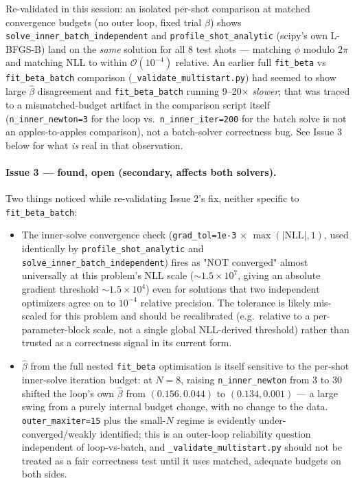 \documentclass[11pt,a4paper]{article}
\newcommand{\code}[1]{\texttt{#1}}
\begin{document}
Re-validated in this session: an isolated per-shot comparison at matched
convergence budgets (no outer loop, fixed trial $\beta$) shows
\code{solve\_inner\_batch\_independent} and \code{profile\_shot\_analytic}
(scipy's own L-BFGS-B) land on the \emph{same} solution for all 8 test
shots --- matching $\phi$ modulo $2\pi$ and matching NLL to within
$\mathcal{O}(10^{-4})$ relative. An earlier full \code{fit\_beta} vs
\code{fit\_beta\_batch} comparison (\code{\_validate\_multistart.py}) had
seemed to show large $\hat\beta$ disagreement and \code{fit\_beta\_batch}
running 9--20$\times$ \emph{slower}; that was traced to a mismatched-budget
artifact in the comparison script itself (\code{n\_inner\_newton=3} for the
loop vs.\ \code{n\_inner\_iter=200} for the batch solve is not an
apples-to-apples comparison), not a batch-solver correctness bug. See
Issue 3 below for what \emph{is} real in that observation.

\paragraph{Issue 3 --- found, open (secondary, affects both solvers).} Two
things noticed while re-validating Issue 2's fix, neither specific to
\code{fit\_beta\_batch}:
\begin{itemize}
\item The inner-solve convergence check (\code{grad\_tol=1e-3} $\times$
  $\max(|\mathrm{NLL}|,1)$, used identically by \code{profile\_shot\_analytic}
  and \code{solve\_inner\_batch\_independent}) fires as "NOT converged"
  almost universally at this problem's NLL scale ($\sim\!1.5\times10^7$,
  giving an absolute gradient threshold $\sim\!1.5\times10^4$) even for
  solutions that two independent optimizers agree on to $10^{-4}$ relative
  precision. The tolerance is likely mis-scaled for this problem and
  should be recalibrated (e.g.\ relative to a per-parameter-block scale,
  not a single global NLL-derived threshold) rather than trusted as a
  correctness signal in its current form.
\item $\hat\beta$ from the full nested \code{fit\_beta} optimisation is
  itself sensitive to the per-shot inner-solve iteration budget: at $N=8$,
  raising \code{n\_inner\_newton} from 3 to 30 shifted the loop's own
  $\hat\beta$ from $(0.156, 0.044)$ to $(0.134, 0.001)$ --- a large swing
  from a purely internal budget change, with no change to the data.
  \code{outer\_maxiter=15} plus the small-$N$ regime is evidently
  under-converged/weakly identified; this is an outer-loop reliability
  question independent of loop-vs-batch, and \code{\_validate\_multistart.py}
  should not be treated as a fair correctness test until it uses matched,
  adequate budgets on both sides.
\end{itemize}
\end{document}
